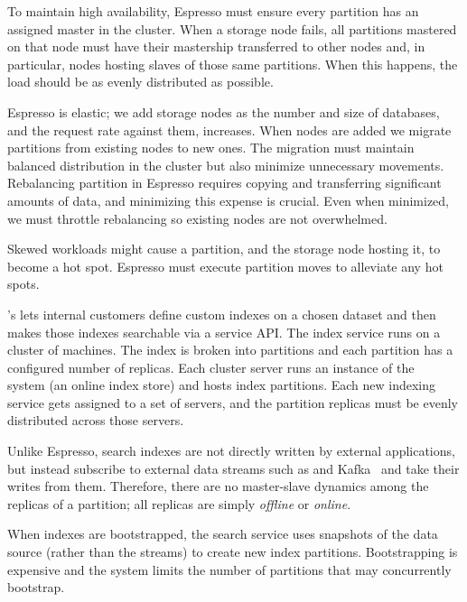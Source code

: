To maintain high availability, Espresso must ensure every partition has an assigned master in the cluster. 
When a storage node fails, all partitions mastered on that node must have their mastership transferred to other
nodes and, in particular, nodes hosting slaves of those same partitions.  When this happens, the load should be as 
evenly distributed as possible.

Espresso is elastic; we add storage nodes as the number and size of databases, and the request rate against them, increases.
When nodes are added we migrate partitions from existing nodes to new ones.
The migration must maintain balanced distribution in the cluster but also minimize unnecessary movements. 
Rebalancing partition in Espresso requires copying and transferring significant amounts of data, and minimizing this expense is 
crucial.  Even when minimized, we must throttle rebalancing so 
existing nodes are not overwhelmed.

Skewed workloads might cause a partition, and the storage
node hosting it, to become a hot spot.  Espresso must execute partition moves to
alleviate any hot spots.

\subheader{\seas}
\linkedin's \seas lets internal customers define custom indexes on a
chosen dataset and then makes those indexes searchable via a service API.
The index service runs on a cluster of machines.  The index is broken into partitions
and each partition has a configured number of replicas.  Each cluster server runs 
an instance of the \sensei~\cite{sensei} system (an online index store) 
and hosts index partitions. Each new indexing service gets assigned
to a set of servers, and the partition replicas must be evenly distributed
across those servers. 

Unlike Espresso, search indexes are not directly written by external
applications, but instead subscribe to external data streams such as 
\databus and Kafka~\cite{linkedin12} and take their writes from them.  Therefore, 
there are no master-slave dynamics among the replicas of a partition; all replicas
are simply \emph{offline} or \emph{online}.  

When indexes are bootstrapped, the search service uses snapshots of the data
source (rather than the streams) to create new index partitions.   Bootstrapping 
is expensive and the system limits the number of partitions that may
concurrently bootstrap.  

